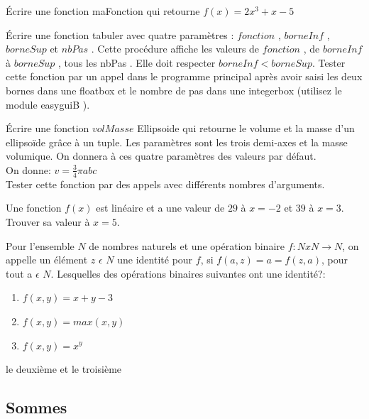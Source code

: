 \begin{exercise}
Écrire une fonction maFonction qui retourne $f(x) = 2x^{3} + x - 5$
\end{exercise}

\begin{exercise}
Écrire une fonction tabuler avec quatre paramètres : $fonction$ , $borneInf$ , $borneSup$
et $nbPas$ . Cette procédure affiche les valeurs de $fonction$ , de $borneInf$ à $borneSup$ ,
tous les nbPas . Elle doit respecter $borneInf < borneSup$.
Tester cette fonction par un appel dans le programme principal après avoir saisi les
deux bornes dans une floatbox et le nombre de pas dans une integerbox (utilisez le
module easyguiB ).
\end{exercise}

\begin{exercise}
Écrire une fonction $volMasse$ Ellipsoide qui retourne le volume et la masse d'un ellipsoïde grâce à un tuple. Les paramètres sont les trois demi-axes et la masse volumique. On donnera à ces quatre paramètres des valeurs par défaut. \\
On donne: $v = \frac{3}{4} \pi abc$ \\
Tester cette fonction par des appels avec différents nombres d'arguments.
\end{exercise}

\begin{exercise}
Une fonction $f (x)$ est lin\'eaire et a une valeur de $29$ \`a $x = -2$ et $39$ à $x = 3$. Trouver sa valeur à $x = 5$.
\end{exercise}

\begin{exercise}
Pour l'ensemble $N$ de nombres naturels et une opération binaire $f: N x N \longrightarrow N$, on appelle un élément $z$ $\epsilon$ $N$ une identité pour $f$, si $f (a, z) = a = f (z, a)$, pour tout a $\epsilon$ $N$. Lesquelles des opérations binaires suivantes ont une identité?:
\begin{enumerate}
  \item $f (x, y) = x + y - 3$
  \item $f (x, y) = max(x, y)$
  \item $f (x, y) = x^{y}$
\end{enumerate}
\end{exercise}
\begin{solution}
le deuxième et le troisième 
\end{solution}
 \subsection{Sommes}
